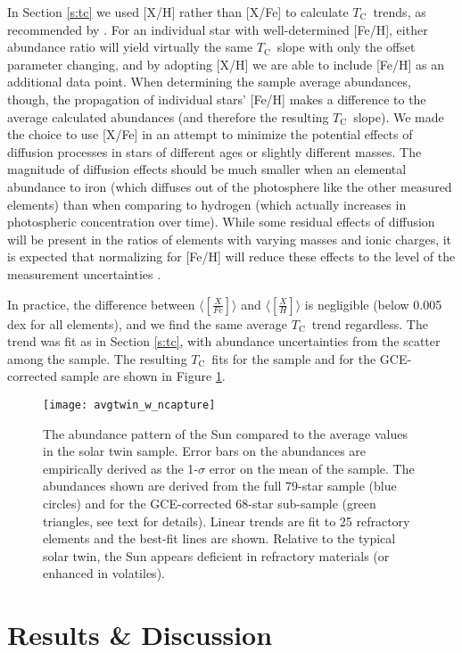 \documentclass[twocolumn]{aastex62}
\newcommand{\tc}{$T_\mathrm{C}$}
\newcommand{\acronym}[1]{{\small{#1}}}
\begin{document}
In Section \ref{s:tc} we used [X/H] rather than [X/Fe] to calculate \tc\ trends, as recommended by \citet{adibekyan16}. For an individual star with well-determined [Fe/H], either abundance ratio will yield virtually the same \tc\ slope with only the offset parameter changing, and by adopting [X/H] we are able to include [Fe/H] as an additional data point. When determining the sample average abundances, though, the propagation of individual stars' [Fe/H] makes a difference to the average calculated abundances (and therefore the resulting \tc\ slope). We made the choice to use [X/Fe] in an attempt to minimize the potential effects of diffusion processes in stars of different ages or slightly different masses. The magnitude of diffusion effects should be much smaller when an elemental abundance to iron (which diffuses out of the photosphere like the other measured elements) than when comparing to hydrogen (which actually increases in photospheric concentration over time). While some residual effects of diffusion will be present in the ratios of elements with varying masses and ionic charges, it is expected that normalizing for [Fe/H] will reduce these effects to the level of the measurement uncertainties \citep{dotter17}.

In practice, the difference between $\langle [ \frac{X}{Fe} ] \rangle$ and $\langle [ \frac{X}{H} ] \rangle$ is negligible (below 0.005 dex for all elements), and we find the same average \tc\ trend regardless. The trend was fit as in Section \ref{s:tc}, with abundance uncertainties from the scatter among the sample. The resulting \tc\ fits for the sample and for the GCE-corrected sample are shown in Figure \ref{fig:avgtwin}.

\begin{figure}
\centering
\texttt{[image: avgtwin\_w\_ncapture]}
\caption{The abundance pattern of the Sun compared to the average values in the solar twin sample. Error bars on the abundances are empirically derived as the 1-$\sigma$ error on the mean of the sample. The abundances shown are derived from the full 79-star sample (blue circles) and for the \acronym{GCE}-corrected 68-star sub-sample (green triangles, see text for details). Linear trends are fit to 25 refractory elements and the best-fit lines are shown. Relative to the typical solar twin, the Sun appears deficient in refractory materials (or enhanced in volatiles).}
\label{fig:avgtwin}
\end{figure}


\section{Results \& Discussion}
\end{document}
